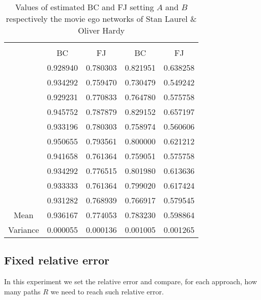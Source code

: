 		 \begin{table}[h]
		 	\centering
		 	\begin{tabular}{l|l|l|l|l|}
		 		\cline{2-5}
		 		&\multicolumn{2}{c|}{\fsamp} & \multicolumn{2}{c|}{\base}\\
		 		\cline{2-5}
		 		& \multicolumn{1}{c|}{BC} & \multicolumn{1}{c|}{FJ} & \multicolumn{1}{c|}{BC} & \multicolumn{1}{c|}{FJ}\\
		 		\cline{2-5}
		 		& 0.928940 & 0.780303 &  0.821951 & 0.638258\\
		 		& 0.934292 & 0.759470 &  0.730479 & 0.549242\\
		 		& 0.929231 & 0.770833 &  0.764780 & 0.575758\\
		 		& 0.945752 & 0.787879 &  0.829152 & 0.657197\\
		 		& 0.933196 & 0.780303 &  0.758974 & 0.560606\\
		 		& 0.950655 & 0.793561 &  0.800000 & 0.621212\\
		 		& 0.941658 & 0.761364 &  0.759051 & 0.575758\\
		 		& 0.934292 & 0.776515 &  0.801980 & 0.613636\\
		 		& 0.933333 & 0.761364 &  0.799020 & 0.617424\\
		 		& 0.931282 & 0.768939 &  0.766917 & 0.579545\\
		 		\hline
		 		\multicolumn{1}{|c|}{Mean} & 0.936167 & 0.774053 & 0.783230 & 0.598864\\
		 		\multicolumn{1}{|c|}{Variance} & 0.000055 & 0.000136 & 0.001005 & 0.001265\\
		 		\hline  %
		 	\end{tabular}
		 	\caption{Values of estimated BC and FJ setting $A$ and $B$ respectively the movie ego networks of Stan Laurel \& Oliver Hardy }
		 	\label{table:stanlio}
		 \end{table}
	\subsection*{Fixed relative error}
	
	In this experiment we set the relative error and compare, for each approach, how many paths $R$ we need to reach such relative error.\medskip
	
